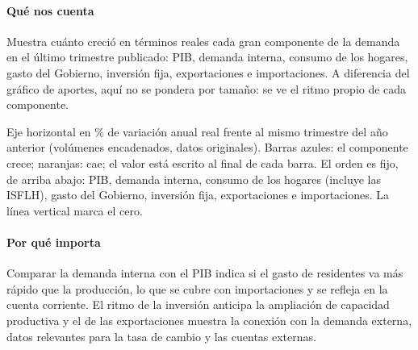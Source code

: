 \paragraph{Qué nos cuenta}
Muestra cuánto creció en términos reales cada gran componente de la demanda en el último trimestre publicado: PIB, demanda interna, consumo de los hogares, gasto del Gobierno, inversión fija, exportaciones e importaciones. A diferencia del gráfico de aportes, aquí no se pondera por tamaño: se ve el ritmo propio de cada componente.

\begin{leer}
Eje horizontal en \% de variación anual real frente al mismo trimestre del año anterior (volúmenes encadenados, datos originales). Barras azules: el componente crece; naranjas: cae; el valor está escrito al final de cada barra. El orden es fijo, de arriba abajo: PIB, demanda interna, consumo de los hogares (incluye las ISFLH), gasto del Gobierno, inversión fija, exportaciones e importaciones. La línea vertical marca el cero.
\end{leer}

\paragraph{Por qué importa}
Comparar la demanda interna con el PIB indica si el gasto de residentes va más rápido que la producción, lo que se cubre con importaciones y se refleja en la cuenta corriente. El ritmo de la inversión anticipa la ampliación de capacidad productiva y el de las exportaciones muestra la conexión con la demanda externa, datos relevantes para la tasa de cambio y las cuentas externas.

